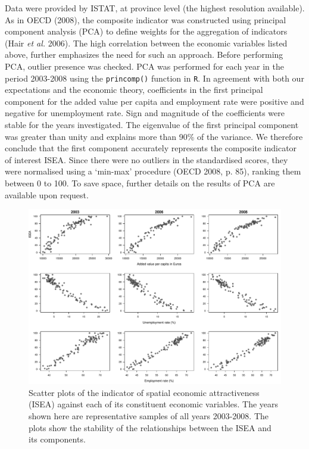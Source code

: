 Data were provided by ISTAT, at province level (the highest resolution available). As in OECD (2008), the composite indicator was constructed using principal component analysis (PCA) to define weights for the aggregation of indicators (Hair \textit{et al.} 2006). The high correlation between the economic variables listed above, further emphasizes the need for such an approach. Before performing PCA, outlier presence was checked. PCA was performed for each year in the period 2003-2008 using the \texttt{princomp()} function in \texttt{R}. In agreement with both our expectations and the economic theory, coefficients in the first principal component for the added value per capita and employment rate were positive and negative for unemployment rate. Sign and magnitude of the coefficients were stable for the years investigated. The eigenvalue of the first principal component was greater than unity and explains more than 90\% of the variance. We therefore conclude that the first component accurately represents the composite indicator of interest ISEA. Since there were no outliers in the standardised scores, they were normalised using a `min-max' procedure (OECD 2008, p. 85), ranking them between 0 to 100. To save space, further details on the results of PCA are available upon request.
  
\begin{figure}[tbp]
\centering
	\includegraphics[width=\textwidth]{it/ISEAsens.pdf}
\caption{Scatter plots of the indicator of spatial economic attractiveness (ISEA) against each of its constituent economic variables. The years shown here are representative samples of all years 2003-2008. The plots show the stability of the relationships between the ISEA and its components.}
	\label{fig4}
\end{figure}   
  
